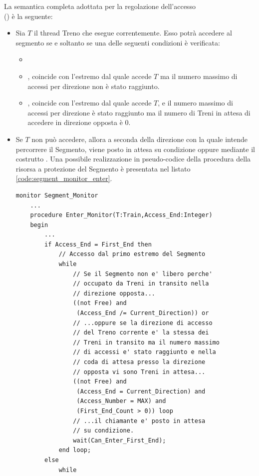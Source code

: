 \begin{description}
		La semantica completa adottata per la regolazione dell'accesso \\() è la seguente:
		\begin{itemize}
			\item Sia $T$ il thread Treno che esegue correntemente. Esso potrà accedere al segmento se e soltanto se una delle seguenti condizioni è verificata:
				\begin{itemize}
					\item {}
					\item {},  coincide con l'estremo dal quale accede $T$ ma il numero massimo di accessi per direzione non è stato raggiunto.
					\item {},  coincide con l'estremo dal quale accede $T$, e il numero massimo di accessi per direzione è stato raggiunto ma il numero di Treni in attesa di accedere in direzione opposta è 0.
				\end{itemize}
			\item Se $T$ non può accedere, allora a seconda della direzione con la quale intende percorrere il Segmento, viene posto in attesa su condizione  oppure  mediante il costrutto . Una possibile realizzazione in pseudo-codice della procedura  della risorsa  a protezione del Segmento è presentata nel listato \ref{code:segment_monitor_enter}.
\begin{lstlisting}[caption=\small{Procedura protetta \ttt{Enter\_Monitor} per l'accesso al Segmento.},label=code:segment_monitor_enter]
monitor Segment_Monitor
	...
	procedure Enter_Monitor(T:Train,Access_End:Integer) 
	begin
		...
		if Access_End = First_End then
			// Accesso dal primo estremo del Segmento
			while 
				// Se il Segmento non e' libero perche'
				// occupato da Treni in transito nella
				// direzione opposta...
				((not Free) and 
				 (Access_End /= Current_Direction)) or 
				// ...oppure se la direzione di accesso
				// del Treno corrente e' la stessa dei 
				// Treni in transito ma il numero massimo
				// di accessi e' stato raggiunto e nella
				// coda di attesa presso la direzione 
				// opposta vi sono Treni in attesa...
				((not Free) and 
				 (Access_End = Current_Direction) and 
				 (Access_Number = MAX) and 
				 (First_End_Count > 0)) loop
				// ...il chiamante e' posto in attesa
				// su condizione.
				wait(Can_Enter_First_End);
			end loop;
		else
			while

\end{lstlisting}
\end{itemize}
\end{description}
